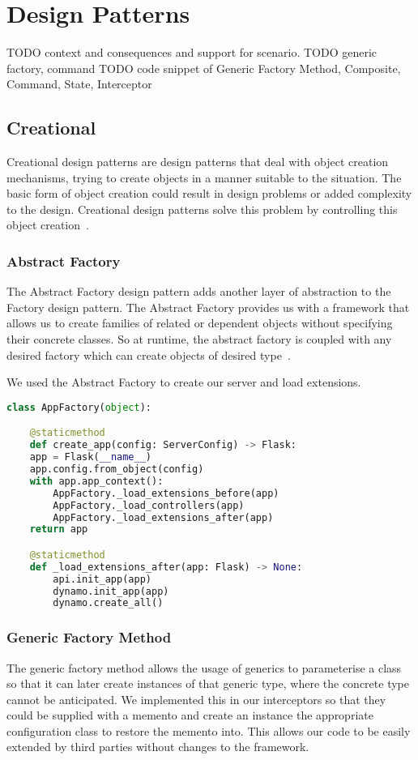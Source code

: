 \chapter{Design Patterns}
TODO context and consequences and support for scenario.
TODO generic factory, command
TODO code snippet of Generic Factory Method, Composite, Command, State, Interceptor

\section{Creational}
Creational design patterns are design patterns that deal with object creation
mechanisms, trying to create objects in a manner suitable to the situation. The basic form of object
creation could result in design problems or added complexity to the design. Creational design patterns
solve this problem by controlling this object creation~\citep{oodesign}.

\subsection{Abstract Factory}
The Abstract Factory design pattern adds another layer of abstraction to the Factory design pattern.
The Abstract Factory provides us with a framework that allows us to create families of related or
dependent objects without specifying their concrete classes. So at runtime, the abstract factory is
coupled with any desired factory which can create objects of desired type~\citep{oodesign}.

We used the Abstract Factory to create our server and load extensions.


\begin{lstlisting}[language=Python]
class AppFactory(object):

	@staticmethod
	def create_app(config: ServerConfig) -> Flask:
	app = Flask(__name__)
	app.config.from_object(config)
	with app.app_context():
		AppFactory._load_extensions_before(app)
		AppFactory._load_controllers(app)
		AppFactory._load_extensions_after(app)
	return app

	@staticmethod
	def _load_extensions_after(app: Flask) -> None:
		api.init_app(app)
		dynamo.init_app(app)
		dynamo.create_all()
\end{lstlisting}


\subsection{Generic Factory Method}
The generic factory method allows the usage of generics to parameterise a class so that it can later create instances
of that generic type, where the concrete type cannot be anticipated. We implemented this in our interceptors so
that they could be supplied with a memento and create an instance the appropriate configuration class to restore the
memento into. This allows our code to be easily extended by third parties without changes to the framework.

